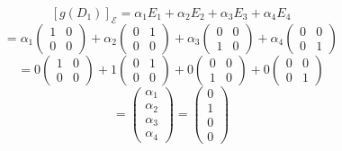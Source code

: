 \documentclass[a4paper]{article}
\theoremstyle{break}
\theoremstyle{break}
\theoremstyle{break}
\theoremstyle{break}
\begin{document}
\begin{enumerate}
        \[
          [g(D_1)]_{\mathcal{E}} = \alpha_1 E_1 + \alpha_2 E_2 + \alpha_3 E_3 + \alpha_4 E_4
        \] 
        \[
        = \alpha_1 \begin{pmatrix} 
          1 & 0\\
          0 & 0
        \end{pmatrix}
        + \alpha_2 \begin{pmatrix} 
          0 & 1\\
          0 & 0
        \end{pmatrix}
        + \alpha_3 \begin{pmatrix} 
          0 & 0\\
          1 & 0
        \end{pmatrix}
        + \alpha_4 \begin{pmatrix} 
          0 & 0\\
          0 & 1
        \end{pmatrix}
        \] 
        \[
        = 0 \begin{pmatrix} 
          1 & 0\\
          0 & 0
        \end{pmatrix}
        + 1 \begin{pmatrix} 
          0 & 1\\
          0 & 0
        \end{pmatrix}
        +0 \begin{pmatrix} 
          0 & 0\\
          1 & 0
        \end{pmatrix}
        + 0 \begin{pmatrix} 
          0 & 0\\
          0 & 1
        \end{pmatrix}
        \] 
        \[
        =
        \begin{pmatrix} 
          \alpha_1\\
          \alpha_2\\
          \alpha_3\\
          \alpha_4
        \end{pmatrix} 
        = \begin{pmatrix} 
          0\\
          1\\
          0\\
          0
        \end{pmatrix} 
        \] 


\end{enumerate}
\end{document}
